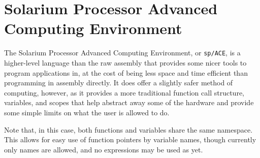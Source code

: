 \documentclass{article}
\begin{document}


\pagebreak

\section{Solarium Processor Advanced Computing Environment}

The Solarium Processor Advanced Computing Environment, or \texttt{sp/ACE}, is a higher-level language than the raw assembly that provides some nicer tools to program applications in, at the cost of being less space and time efficient than programming in assembly directly. It does offer a slightly safer method of computing, however, as it provides a more traditional function call structure, variables, and scopes that help abstract away some of the hardware and provide some simple limits on what the user is allowed to do.

Note that, in this case, both functions and variables share the same namespace. This allows for easy use of function pointers by variable names, though currently only names are allowed, and no expressions may be used as yet.
\end{document}

